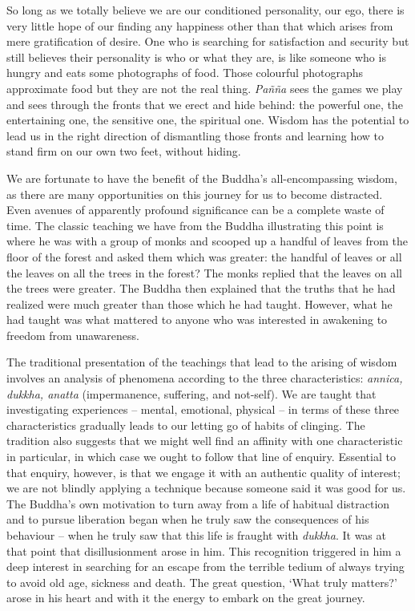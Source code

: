 So long as we totally believe we are our conditioned personality, our
ego, there is very little hope of our finding any happiness other than
that which arises from mere gratification of desire. One who is
searching for satisfaction and security but still believes their
personality is who or what they are, is like someone who is hungry and
eats some photographs of food. Those colourful photographs approximate
food but they are not the real thing. \emph{Pañña} sees the games we
play and sees through the fronts that we erect and hide behind: the
powerful one, the entertaining one, the sensitive one, the spiritual
one. Wisdom has the potential to lead us in the right direction of
dismantling those fronts and learning how to stand firm on our own two
feet, without hiding.

We are fortunate to have the benefit of the Buddha's all-encompassing
wisdom, as there are many opportunities on this journey for us to become
distracted. Even avenues of apparently profound significance can be a
complete waste of time. The classic teaching we have from the Buddha
illustrating this point is where he was with a group of monks and
scooped up a handful of leaves from the floor of the forest and asked
them which was greater: the handful of leaves or all the leaves on all
the trees in the forest? The monks replied that the leaves on all the
trees were greater. The Buddha then explained that the truths that he
had realized were much greater than those which he had taught. However,
what he had taught was what mattered to anyone who was interested in
awakening to freedom from unawareness.

The traditional presentation of the teachings that lead to the arising
of wisdom involves an analysis of phenomena according to the three
characteristics: \emph{annica, dukkha, anatta} (impermanence, suffering,
and not-self). We are taught that investigating experiences -- mental,
emotional, physical -- in terms of these three characteristics gradually
leads to our letting go of habits of clinging. The tradition also
suggests that we might well find an affinity with one characteristic in
particular, in which case we ought to follow that line of enquiry.
Essential to that enquiry, however, is that we engage it with an
authentic quality of interest; we are not blindly applying a technique
because someone said it was good for us. The Buddha's own motivation to
turn away from a life of habitual distraction and to pursue liberation
began when he truly saw the consequences of his behaviour -- when he
truly saw that this life is fraught with \emph{dukkha}. It was at that
point that disillusionment arose in him. This recognition triggered in
him a deep interest in searching for an escape from the terrible tedium
of always trying to avoid old age, sickness and death. The great
question, `What truly matters?' arose in his heart and with it the
energy to embark on the great journey.


